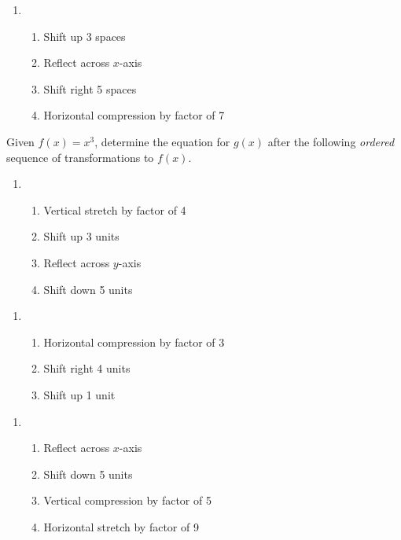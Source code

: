 \begin{enumerate}	\setcounter{enumi}{\value{Review}}
\item \begin{enumerate}[(1)]
\setlength\itemsep{0pt}
	\item Shift up 3 spaces
	\item Reflect across $x$-axis
	\item Shift right 5 spaces
	\item Horizontal compression by factor of 7
\end{enumerate}
\setcounter{Review}{\value{enumi}}
\end{enumerate}

Given $f(x) = x^3$, determine the equation for $g(x)$ after the following \emph{ordered} sequence of transformations to $f(x)$.
\begin{enumerate}	\setcounter{enumi}{\value{Review}}
\item \begin{enumerate}[(1)]
\setlength\itemsep{0pt}
	\item Vertical stretch by factor of 4
	\item Shift up 3 units
	\item Reflect across $y$-axis
	\item Shift down 5 units
\end{enumerate}
\setcounter{Review}{\value{enumi}}
\end{enumerate}

\begin{enumerate}	\setcounter{enumi}{\value{Review}}
\item \begin{enumerate}[(1)]
\setlength\itemsep{0pt}
	\item Horizontal compression by factor of 3
	\item Shift right 4 units
	\item Shift up 1 unit
\end{enumerate}
\setcounter{Review}{\value{enumi}}
\end{enumerate}

\begin{enumerate}	\setcounter{enumi}{\value{Review}}
\item \begin{enumerate}[(1)]
\setlength\itemsep{0pt}
	\item Reflect across $x$-axis
	\item Shift down 5 units
	\item Vertical compression by factor of 5
	\item Horizontal stretch by factor of 9
\end{enumerate}
\setcounter{Review}{\value{enumi}}
\end{enumerate}

